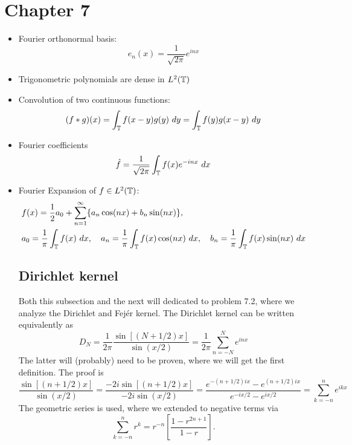 \newpage
\section{Chapter 7}
\begin{itemize}
    \item Fourier orthonormal basis: 
    \[e_n(x) = \frac{1}{\sqrt{2\pi}}e^{inx}\]
    \item Trigonometric polynomials are dense in $L^2(\mathbb{T})$ 
    \item Convolution of two continuous functions:
    \[(f\ast g)(x) = \int_{\mathbb{T}} f(x - y) g(y) \ dy = \int_{\mathbb{T}} f(y)g(x - y) \ dy\]



\item Fourier coefficients 
\[\hat{f} = \frac{1}{\sqrt{2\pi}}\int_{\mathbb{T}} f(x) e^{-inx} \ dx\]

\item Fourier Expansion of $f \in L^2(\mathbb{T})$:
\begin{align*}
    &f(x) = \frac{1}{2}a_0 + \sum_{n = 1}^\infty \{ a_n \cos(nx) + b_n\sin(nx)\},\\
    &a_0 = \frac{1}{\pi}\int_{\mathbb{T}} f(x) \ dx, \quad a_n = \frac{1}{\pi}\int_{\mathbb{T}} f(x) \cos(nx) \ dx, \quad b_n = \frac{1}{\pi} \int_{\mathbb{T}} f(x)\sin(nx) \ dx 
\end{align*}

\newpage
\subsection{Dirichlet kernel}
Both this subsection and the next will dedicated to problem 7.2, where we analyze the Dirichlet and Fej\'er kernel. The Dirichlet kernel can be written equivalently as
\[D_N = \frac{1}{2\pi}\frac{\sin[(N + 1/2)x]}{\sin(x/2)} = \frac{1}{2\pi}\sum_{n = -N}^Ne^{inx}\]
The latter will (probably) need to be proven, where we will get the first definition. The proof is 
 \[\frac{\sin [(n + 1/2)x]}{\sin(x/2)} = \frac{-2i\sin [(n + 1/2)x]}{-2i\sin(x/2)} = \frac{e^{-(n+1/2)ix} - e^{(n+1/2)ix}}{e^{-ix/2} - e^{ix/2}} = \sum_{k = -n}^n e^{ikx}\]
    The geometric series is used, where we extended to negative terms via
    \[\sum_{k = -n}^n r^k = r^{-n}\left[ \frac{1 - r^{2n+1}}{1-r}\right].\]


\end{itemize}
